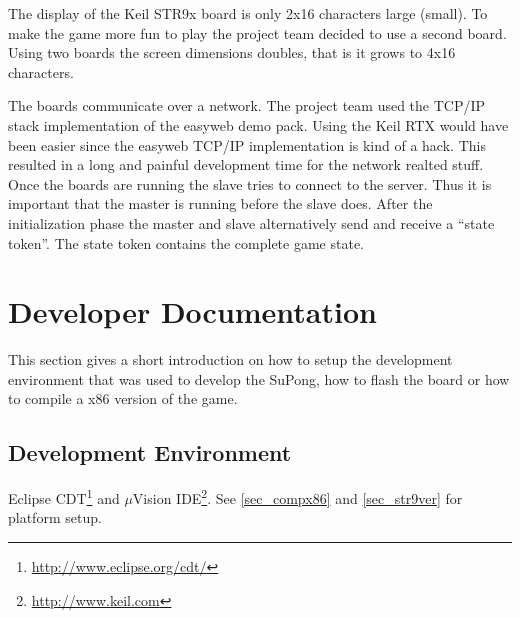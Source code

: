 The display of the Keil STR9x board is only 2x16 characters large (small). To
make the game more fun to play the project team decided to use a second board.
Using two boards the screen dimensions doubles, that is it grows to 4x16
characters.

The boards communicate over a network. The project team used the TCP/IP
stack implementation of the easyweb demo pack. Using the Keil RTX would have
been easier since the easyweb TCP/IP implementation is kind of a hack.
This resulted in a long and painful development time for the network realted
stuff. Once the boards are running the slave tries to connect to the server. 
Thus it is important that the master is running before the slave does. After the
initialization phase the master and slave alternatively send and receive a
``state token''. The state token contains the complete game state.

\newpage
\section{Developer Documentation}
\label{sec_devdoc}
This section gives a short introduction on how to setup the development
environment that was used to develop the SuPong, how to flash the board or how
to compile a x86 version of the game.

\subsection{Development Environment}
Eclipse CDT\footnote{\url{http://www.eclipse.org/cdt/}} and $\mu$Vision
IDE\footnote{\url{http://www.keil.com}}. See \ref{sec_compx86} and
\ref{sec_str9ver} for platform setup.

